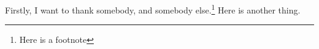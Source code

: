 \begin{acknowledgements}
Firstly, I want to thank somebody, and somebody else.\footnote{Here is a footnote} Here is another thing.
\end{acknowledgements}
